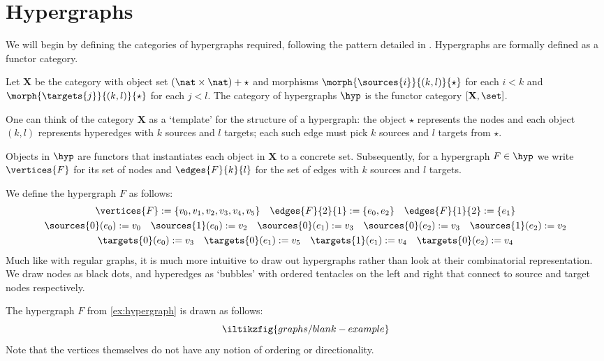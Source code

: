 \section{Hypergraphs}

We will begin by defining the categories of hypergraphs required, following the
pattern detailed in \cite{bonchi2022string}.
Hypergraphs are formally defined as a functor category.

\begin{definition}
    Let \(\mathbf{X}\) be the category with object set
    \((\nat \times \nat) + \star\) and morphisms
    \(\morph{\sources{i}}{(k,l)}{\star}\) for each \(i < k\)
    and \(\morph{\targets{j}}{(k,l)}{\star}\) for each \(j < l\).
    The category of hypergraphs \(\hyp\) is the functor category
    \([\mathbf{X}, \set]\).
\end{definition}

One can think of the category \(\mathbf{X}\) as a `template' for the structure
of a hypergraph: the object \(\star\) represents the nodes and each object
\((k, l)\) represents hyperedges with \(k\) sources and \(l\) targets; each such
edge must pick \(k\) sources and \(l\) targets from \(\star\).

Objects in \(\hyp\) are functors that instantiates each object in \(\mathbf{X}\)
to a concrete set.
Subsequently, for a hypergraph \(F \in \hyp\) we write \(\vertices{F}\) for its
set of nodes and \(\edges{F}{k}{l}\) for the set of edges with \(k\) sources and
\(l\) targets.

\begin{example}\label{ex:hypergraph}
    We define the hypergraph \(F\) as follows:
    \begin{gather*}
        \vertices{F} := \{v_0,v_1,v_2,v_3,v_4,v_5\}
        \quad
        \edges{F}{2}{1} := \{e_0,e_2\}
        \quad
        \edges{F}{1}{2} := \{e_1\}
        \\
        \sources{0}(e_0) := v_0
        \quad
        \sources{1}(e_0) := v_2
        \quad
        \sources{0}(e_1) := v_3
        \quad
        \sources{0}(e_2) := v_3
        \quad
        \sources{1}(e_2) := v_2
        \\
        \targets{0}(e_0) := v_3
        \quad
        \targets{0}(e_1) := v_5
        \quad
        \targets{1}(e_1) := v_4
        \quad
        \targets{0}(e_2) := v_4
    \end{gather*}
    Much like with regular graphs, it is much more intuitive to draw out hypergraphs
    rather than look at their combinatorial representation.
    We draw nodes as black dots, and hyperedges as `bubbles' with ordered tentacles
    on the left and right that connect to source and target nodes respectively.

    The hypergraph \(F\) from \cref{ex:hypergraph} is drawn as follows:
    \[
        \iltikzfig{graphs/blank-example}
    \]
    Note that the vertices themselves do not have any notion of ordering or
    directionality.
\end{example}

